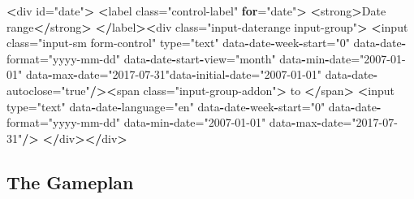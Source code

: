 \documentclass[]{article}
\newenvironment{Shaded}{\begin{snugshade}}{\end{snugshade}}
\newcommand{\ControlFlowTok}[1]{\textcolor[rgb]{0.13,0.29,0.53}{\textbf{#1}}}
\newcommand{\ErrorTok}[1]{\textcolor[rgb]{0.64,0.00,0.00}{\textbf{#1}}}
\newcommand{\NormalTok}[1]{#1}
\newcommand{\OperatorTok}[1]{\textcolor[rgb]{0.81,0.36,0.00}{\textbf{#1}}}
\newcommand{\StringTok}[1]{\textcolor[rgb]{0.31,0.60,0.02}{#1}}
\begin{document}
\begin{Shaded}
\begin{Highlighting}[]
\OperatorTok{<}\NormalTok{div id=}\StringTok{"date"}\OperatorTok{>}
\ErrorTok{<}\NormalTok{label class=}\StringTok{"control-label"} \ControlFlowTok{for}\NormalTok{=}\StringTok{"date"}\OperatorTok{>}\StringTok{ }\ErrorTok{<}\NormalTok{strong}\OperatorTok{>}\NormalTok{Date range}\OperatorTok{<}\ErrorTok{/}\NormalTok{strong}\OperatorTok{>}
\ErrorTok{</}\NormalTok{label}\OperatorTok{>}\ErrorTok{<}\NormalTok{div class=}\StringTok{"input-daterange input-group"}\OperatorTok{>}
\ErrorTok{<}\NormalTok{input class=}\StringTok{"input-sm form-control"}\NormalTok{ type=}\StringTok{"text"}
\NormalTok{data}\OperatorTok{-}\NormalTok{date}\OperatorTok{-}\NormalTok{week}\OperatorTok{-}\NormalTok{start=}\StringTok{"0"}\NormalTok{ data}\OperatorTok{-}\NormalTok{date}\OperatorTok{-}\NormalTok{format=}\StringTok{"yyyy-mm-dd"}
\NormalTok{data}\OperatorTok{-}\NormalTok{date}\OperatorTok{-}\NormalTok{start}\OperatorTok{-}\NormalTok{view=}\StringTok{"month"}\NormalTok{ data}\OperatorTok{-}\NormalTok{min}\OperatorTok{-}\NormalTok{date=}\StringTok{"2007-01-01"}
\NormalTok{data}\OperatorTok{-}\NormalTok{max}\OperatorTok{-}\NormalTok{date=}\StringTok{"2017-07-31"}\NormalTok{data}\OperatorTok{-}\NormalTok{initial}\OperatorTok{-}\NormalTok{date=}\StringTok{"2007-01-01"}
\NormalTok{data}\OperatorTok{-}\NormalTok{date}\OperatorTok{-}\NormalTok{autoclose=}\StringTok{"true"}\OperatorTok{/}\ErrorTok{><}\NormalTok{span class=}\StringTok{"input-group-addon"}\OperatorTok{>}
\NormalTok{to }\OperatorTok{<}\ErrorTok{/}\NormalTok{span}\OperatorTok{>}\StringTok{ }\ErrorTok{<}\NormalTok{input  type=}\StringTok{"text"}\NormalTok{ data}\OperatorTok{-}\NormalTok{date}\OperatorTok{-}\NormalTok{language=}\StringTok{"en"}
\NormalTok{data}\OperatorTok{-}\NormalTok{date}\OperatorTok{-}\NormalTok{week}\OperatorTok{-}\NormalTok{start=}\StringTok{"0"}\NormalTok{ data}\OperatorTok{-}\NormalTok{date}\OperatorTok{-}\NormalTok{format=}\StringTok{"yyyy-mm-dd"}
\NormalTok{data}\OperatorTok{-}\NormalTok{min}\OperatorTok{-}\NormalTok{date=}\StringTok{"2007-01-01"}\NormalTok{ data}\OperatorTok{-}\NormalTok{max}\OperatorTok{-}\NormalTok{date=}\StringTok{"2017-07-31"}\OperatorTok{/}\ErrorTok{>}
\StringTok{  }\ErrorTok{</}\NormalTok{div}\OperatorTok{>}\ErrorTok{</}\NormalTok{div}\OperatorTok{>}
\end{Highlighting}
\end{Shaded}

\hypertarget{the-gameplan}{%
\subsection{The Gameplan}\label{the-gameplan}}
\end{document}
